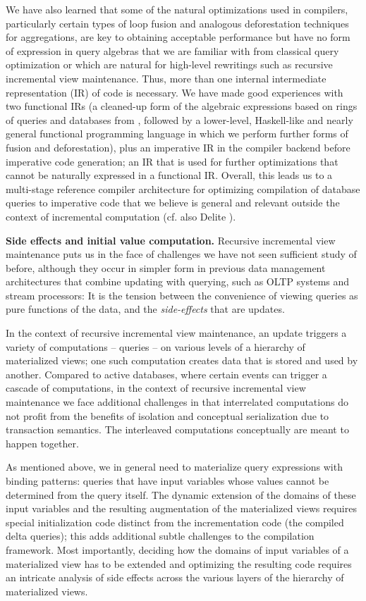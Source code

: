 We have also learned that some of the natural optimizations used in compilers, particularly certain types of loop fusion and analogous deforestation techniques for aggregations, are key to obtaining acceptable performance but have no form of expression in query algebras that we are familiar with from classical query optimization or which are natural for high-level rewritings such as recursive incremental view maintenance. Thus, more than one internal intermediate representation (IR) of code is necessary. We have made good experiences with two functional IRs (a cleaned-up form of the algebraic expressions based on rings of queries and databases from \cite{koch-pods:10}, followed by a lower-level, Haskell-like and nearly general functional programming language in which we perform further forms of fusion and deforestation), plus an imperative IR in the compiler backend before imperative code generation; an IR that is used for further optimizations that cannot be naturally expressed in a functional IR. Overall, this leads us to a multi-stage reference compiler architecture for optimizing compilation of database queries to imperative code that we believe is general and relevant outside the context of incremental computation (cf. also Delite \cite{delite:11}).


{\bf Side effects and initial value computation.}
%
Recursive incremental view maintenance puts us in the face of challenges we have not seen sufficient study of before, although they occur in simpler form in previous data management architectures that combine updating with querying, such as OLTP systems and stream processors: It is the tension between the convenience of viewing queries as pure functions of the data, and the {\em side-effects} that are updates.

In the context of recursive incremental view maintenance, an update triggers a variety of computations -- queries -- on various levels of a hierarchy of materialized views; one such computation creates data that is stored and used by another. Compared to active databases, where certain events can trigger a cascade of computations, in the context of recursive incremental view maintenance we face additional challenges in that interrelated computations do not profit from the benefits of isolation and conceptual serialization due to transaction semantics. The interleaved computations conceptually are meant to happen together.

As mentioned above, we in general need to materialize query expressions with binding patterns: queries that have input variables whose values cannot be determined from the query itself. The dynamic extension of the domains of these input variables and the resulting augmentation of the materialized views requires special initialization code distinct from the incrementation code (the compiled delta queries); this adds additional subtle challenges to the compilation framework. Most importantly, deciding how the domains of input variables of a materialized view has to be extended and optimizing the resulting code requires an intricate analysis of side effects across the various layers of the hierarchy of materialized views.



